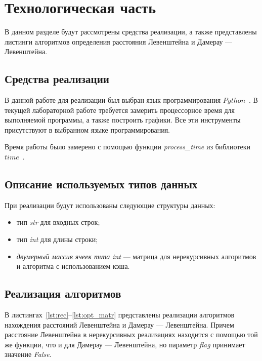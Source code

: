 \chapter{Технологическая часть}

В данном разделе будут рассмотрены средства реализации, а также представлены листинги алгоритмов определения расстояния Левенштейна и Дамерау --- Левенштейна.

\section{Средства реализации}
В данной работе для реализации был выбран язык программирования $Python$~\cite{python-lang}. В текущей лабораторной работе требуется замерить процессорное время для выполняемой программы, а также построить графики. Все эти инструменты присутствуют в выбранном языке программирования.

Время работы было замерено с помощью функции \textit{process\_time} из библиотеки $time$~\cite{python-lang-time}.

\section{Описание используемых типов данных}

При реализации будут использованы следующие структуры данных:
\begin{itemize}[label={---}]
	\item тип \textit{str} для входных строк;
	\item тип \textit{int} для длины строки;
	\item \textit{двумерный массив ячеек типа int} --- матрица для нерекурсивных алгоритмов и алгоритма с использованием кэша.
\end{itemize}

\section{Реализация алгоритмов}

В листингах~\ref{lst:rec}--\ref{lst:opt_matr} представлены реализации алгоритмов нахождения расстояний Левенштейна и Дамерау --- Левенштейна. Причем расстояние Левенштейна в нерекурсивных реализациях находится с помощью той же функции, что и для Дамерау --- Левенштейна, но параметр \textit{flag} принимает значение \textit{False}.

\clearpage

